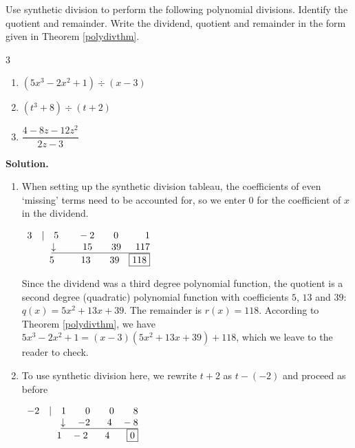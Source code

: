 \documentclass{ximera}
\begin{document}
\begin{example}  Use synthetic division to perform the following polynomial divisions.  Identify the quotient and remainder. Write the dividend, quotient and remainder in the form given in Theorem \ref{polydivthm}.

\begin{multicols}{3}
\begin{enumerate}

\item  $\left(5x^3 - 2x^2 + 1\right) \div (x-3)$ 
\item  $\left(t^3+8\right) \div (t+2)$ 
\item  $\dfrac{4-8z-12z^2}{2z-3}$

\end{enumerate}
\end{multicols}

{ \bf Solution.} 

\begin{enumerate}


\item When setting up the synthetic division tableau, the coefficients of even `missing' terms need to be accounted for, so we enter $0$ for the coefficient of $x$ in the dividend.  

\begin{center}
$
\begin{array}{r}
 3 \quad |\quad 5 \quad\quad -2 \quad\quad 0 \quad\quad \phantom{1.} 1 \\
 \underline{\downarrow \phantom{1} \quad\quad 15 \quad\quad  39 \phantom{1} \quad 117}\\
5\phantom{1.} \quad\quad 13 \quad\quad 39 \quad \fbox{118}
\end{array}
$    
\end{center}


Since the dividend was a third degree polynomial function, the quotient is a second degree (quadratic) polynomial function with coefficients $5$, $13$ and $39$:   $q(x) = 5x^2+13x+39$. The remainder is $r(x) = 118$.  According to Theorem \ref{polydivthm}, we have $5x^3 - 2x^2 + 1 = (x-3)\left(5x^2+13x+39 \right) + 118$, which we leave to the reader to check.

\item  To use synthetic division here, we rewrite $t+2$ as $t-(-2)$ and proceed as before

\begin{center}
$
\begin{array}{r}
 -2 \quad |\quad 1 \quad\quad 0 \quad\quad 0 \quad\quad 8 \\
 \underline{\downarrow \quad  -2 \quad\phantom{1.} 4 \quad -8}\\
1 \quad -2 \phantom{1.}\quad 4 \phantom{1.}\quad \fbox{0}
\end{array}
$    
\end{center}


\end{enumerate}
\end{example}
\end{document}
